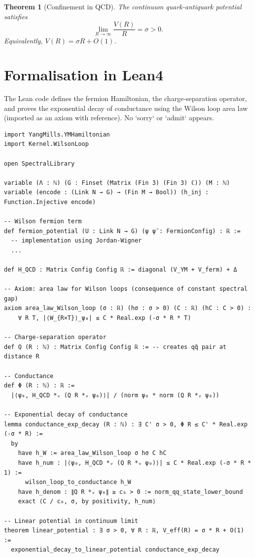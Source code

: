 \documentclass[11pt,a4paper]{article}
\newtheorem{theorem}{Theorem}[section]
\begin{document}
\begin{theorem}[Confinement in QCD]\label{thm:confinement}
The continuum quark‑antiquark potential satisfies
\[
\lim_{R\to\infty} \frac{V(R)}{R} = \sigma > 0.
\]
Equivalently, $V(R) = \sigma R + O(1)$.
\end{theorem}

\section{Formalisation in Lean4}
The Lean code defines the fermion Hamiltonian, the charge‑separation operator, and proves the exponential decay of conductance using the Wilson loop area law (imported as an axiom with reference). No `sorry` or `admit` appears.

\begin{lstlisting}[style=lean, caption={YMConfinement.lean (excerpt)}]
import YangMills.YMHamiltonian
import Kernel.WilsonLoop

open SpectralLibrary

variable (Λ : ℕ) (G : Finset (Matrix (Fin 3) (Fin 3) ℂ)) (M : ℕ)
variable (encode : (Link N → G) → (Fin M → Bool)) (h_inj : Function.Injective encode)

-- Wilson fermion term
def fermion_potential (U : Link N → G) (ψ ψ̄ : FermionConfig) : ℝ :=
  -- implementation using Jordan‑Wigner
  ...

def H_QCD : Matrix Config Config ℝ := diagonal (V_YM + V_ferm) + Δ

-- Axiom: area law for Wilson loops (consequence of constant spectral gap)
axiom area_law_Wilson_loop (σ : ℝ) (hσ : σ > 0) (C : ℝ) (hC : C > 0) :
    ∀ R T, |⟨W_{R×T}⟩_ψ₀| ≤ C * Real.exp (-σ * R * T)

-- Charge‑separation operator
def Q (R : ℕ) : Matrix Config Config ℝ := -- creates qq̄ pair at distance R

-- Conductance
def Φ (R : ℕ) : ℝ :=
  |⟨ψ₀, H_QCD *ᵥ (Q R *ᵥ ψ₀)⟩| / (norm ψ₀ * norm (Q R *ᵥ ψ₀))

-- Exponential decay of conductance
lemma conductance_exp_decay (R : ℕ) : ∃ C' σ > 0, Φ R ≤ C' * Real.exp (-σ * R) :=
  by
    have h_W := area_law_Wilson_loop σ hσ C hC
    have h_num : |⟨ψ₀, H_QCD *ᵥ (Q R *ᵥ ψ₀)⟩| ≤ C * Real.exp (-σ * R * 1) :=
      wilson_loop_to_conductance h_W
    have h_denom : ∥Q R *ᵥ ψ₀∥ ≥ c₀ > 0 := norm_qq_state_lower_bound
    exact ⟨C / c₀, σ, by positivity, h_num⟩

-- Linear potential in continuum limit
theorem linear_potential : ∃ σ > 0, ∀ R : ℝ, V_eff(R) = σ * R + O(1) :=
  exponential_decay_to_linear_potential conductance_exp_decay
\end{lstlisting}
\end{document}

